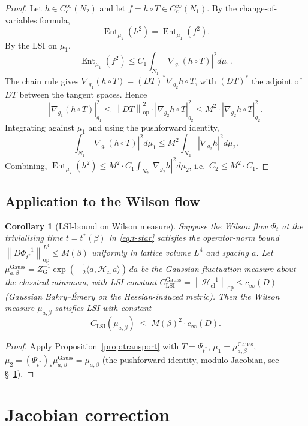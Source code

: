 \documentclass[11pt,a4paper]{amsart}
\newtheorem{corollary}[theorem]{Corollary}
\theoremstyle{definition}
\newcommand{\norm}[1]{\left\lVert#1\right\rVert}
\DeclareMathOperator{\Ent}{Ent}
\begin{document}
\begin{proof}
Let $h\in C^\infty_c(N_2)$ and let $f = h\circ T \in C^\infty_c(N_1)$.
By the change-of-variables formula,
$$
\Ent_{\mu_2}(h^2)
= \Ent_{\mu_1}(f^2).
$$
By the LSI on $\mu_1$,
$$
\Ent_{\mu_1}(f^2) \leq C_1 \int_{N_1} |\nabla_{g_1}(h\circ T)|^2 d\mu_1.
$$
The chain rule gives $\nabla_{g_1}(h\circ T) = (DT)^* \nabla_{g_2} h
\circ T$, with $(DT)^*$ the adjoint of $DT$ between the tangent spaces.
Hence
$$
|\nabla_{g_1}(h\circ T)|_{g_1}^2 \leq \norm{DT}_\mathrm{op}^2 \cdot
|\nabla_{g_2}h \circ T|_{g_2}^2 \leq M^2 \cdot |\nabla_{g_2}h \circ T|_{g_2}^2.
$$
Integrating against $\mu_1$ and using the pushforward identity,
$$
\int_{N_1} |\nabla_{g_1}(h\circ T)|^2 d\mu_1 \leq M^2 \int_{N_2}
|\nabla_{g_2}h|^2 d\mu_2.
$$
Combining, $\Ent_{\mu_2}(h^2) \leq M^2 \cdot C_1 \int_{N_2}
|\nabla_{g_2}h|^2 d\mu_2$, i.e.\ $C_2 \leq M^2 \cdot C_1$.
\end{proof}

\subsection{Application to the Wilson flow}

\begin{corollary}[LSI-bound on Wilson measure]\label{cor:LSI-WF}
Suppose the Wilson flow $\Phi_t$ at the trivialising time $t = t^*(\beta)$
in \eqref{eq:t-star} satisfies the operator-norm bound
$\norm{D\Phi_{t^*}^{-1}}_\mathrm{op}^{L^4} \leq M(\beta)$ uniformly in
lattice volume $L^4$ and spacing $a$. Let
$\mu^\mathrm{Gauss}_{a,\beta} = Z_\mathrm{G}^{-1}\exp(-\tfrac12 \langle a,
\mathcal H_\mathrm{cl}\,a\rangle)\,da$ be the Gaussian fluctuation measure
about the classical minimum, with LSI constant
$C_\mathrm{LSI}^\mathrm{Gauss} = \norm{\mathcal H_\mathrm{cl}^{-1}}_\mathrm{op}
\leq c_\infty(D)$ (Gaussian Bakry--\'Emery on the Hessian-induced
metric). Then the Wilson measure $\mu_{a,\beta}$ satisfies LSI with
constant
$$
C_\mathrm{LSI}(\mu_{a,\beta}) \;\leq\; M(\beta)^2 \cdot c_\infty(D).
$$
\end{corollary}
\begin{proof}
Apply Proposition~\ref{prop:transport} with $T = \Psi_{t^*}$, $\mu_1 =
\mu^\mathrm{Gauss}_{a,\beta}$, $\mu_2 = (\Psi_{t^*})_*\mu^\mathrm{Gauss}_{a,\beta}
= \mu_{a,\beta}$ (the pushforward identity, modulo Jacobian, see
\S~\ref{sec:Jacobian}).
\end{proof}

\section{Jacobian correction}\label{sec:Jacobian}
\end{document}
